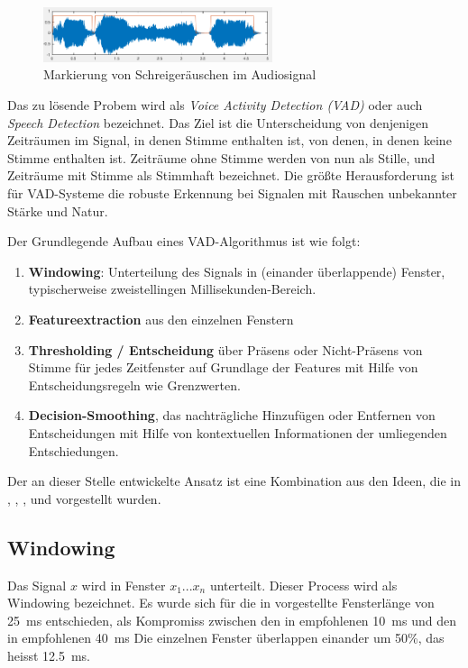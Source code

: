 \begin{figure}
	\centering
	\includegraphics[width=0.6\textwidth]{bilder/VAD_01.png}
	\caption{Markierung von Schreigeräuschen im Audiosignal}
	\label{img:vad01}
\end{figure}

Das zu lösende Probem wird als \emph{Voice Activity Detection (VAD)} oder auch \emph{Speech Detection} bezeichnet. Das Ziel ist die Unterscheidung von denjenigen Zeiträumen im Signal, in denen Stimme enthalten ist, von denen, in denen keine Stimme enthalten ist. Zeiträume ohne Stimme werden von nun als \glqq Stille\grqq{}, und Zeiträume mit Stimme als \glqq Stimmhaft\grqq{} bezeichnet. Die größte Herausforderung ist für VAD-Systeme die robuste Erkennung bei Signalen mit Rauschen unbekannter Stärke und Natur.\cite{vad_granada}

Der Grundlegende Aufbau eines VAD-Algorithmus ist wie folgt:
\begin{enumerate}
	\item \textbf{Windowing}: Unterteilung des Signals in (einander überlappende) Fenster, typischerweise zweistellingen Millisekunden-Bereich.
	\item \textbf{Featureextraction} aus den einzelnen Fenstern
	\item \textbf{Thresholding / Entscheidung} über Präsens oder Nicht-Präsens von Stimme für jedes Zeitfenster auf Grundlage der Features mit Hilfe von Entscheidungsregeln wie Grenzwerten.
	\item \textbf{Decision-Smoothing}, das nachträgliche Hinzufügen oder Entfernen von Entscheidungen mit Hilfe von kontextuellen Informationen der umliegenden Entschiedungen.\cite{vad_granada}
\end{enumerate}

Der an dieser Stelle entwickelte Ansatz ist eine Kombination aus den Ideen, die in \cite{vad_Easy}, \cite{vad_Lisboa}, \cite{vad_entropy}, \cite{vad_ceps} und \cite{vad_entropie02} vorgestellt wurden. 

\subsection{Windowing}
\label{sec:windowing}

Das Signal $x$ wird in Fenster $x_1...x_n$ unterteilt. Dieser Process wird als \glqq Windowing\grqq{} bezeichnet. Es wurde sich für die in \cite{vad_entropy} vorgestellte Fensterlänge von \SI{25}{\milli\second} entschieden, als Kompromiss zwischen den in \cite{vad_Easy} empfohlenen \SI{10}{\milli\second} und den in \cite{vad_ceps} empfohlenen \SI{40}{\milli\second} Die einzelnen Fenster überlappen einander um 50\%, das heisst \SI{12.5}{\milli\second}.

